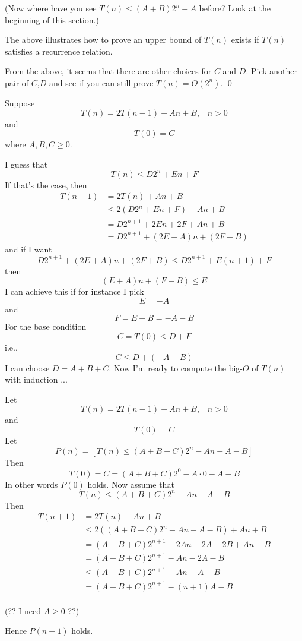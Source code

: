 (Now where have you see
$T(n) \leq (A+B)2^n - A$ before?
Look at the beginning of this section.)

The above illustrates how to prove an upper bound
of $T(n)$ exists 
if $T(n)$
satisfies a recurrence relation.

\begin{ex}
  From the above, it seems that there are other choices for $C$ and $D$.
  Pick another pair of $C$,$D$ and see if you can still
  prove $T(n) = O(2^n)$.
  \qed
\end{ex}


\newpage
Suppose
\[
T(n) = 2T(n - 1) + An + B, \,\,\,\,\, n > 0
\]
and
\[
T(0) = C
\]
where $A, B, C \geq 0$.

I guess that 
\[
T(n) \leq D2^n + En + F
\]
If that's the case, then
\begin{align*}
T(n+1)
&= 2T(n) + An + B \\
&\leq 2(D2^n + En + F) + An + B \\
&= D2^{n+1} + 2En + 2F + An + B \\
&= D2^{n+1} + (2E + A) n + (2F + B) 
\end{align*}
and if I want
\[
D2^{n+1} + (2E + A) n + (2F + B) \leq D2^{n+1} + E(n+1) + F
\]
then
\[
(E + A) n + (F + B) \leq E 
\]
I can achieve this if for instance I pick
\[
E = -A
\]
and
\[
F = E - B = -A - B
\]
For the base condition
\[
C = T(0) \leq D + F
\]
i.e.,
\[
C \leq D + (-A-B)
\]
I can choose $D = A+B+C$.
Now I'm ready to compute the big-$O$ of $T(n)$ with induction ...

Let
\[
T(n) = 2T(n - 1) + An + B, \,\,\,\,\, n > 0
\]
and
\[
T(0) = C
\]
Let
\[
P(n) = [T(n)\leq (A+B+C)2^n - An - A - B]
\]
Then
\[
T(0) = C = (A + B + C)2^0 - A\cdot 0 - A - B
\]
In other words $P(0)$ holds.
Now assume that
\[
T(n) \leq (A+B+C)2^n - An - A - B
\]
Then
\begin{align*}
  T(n+1)
  &= 2T(n) + An + B \\
  &\leq 2 ((A+B+C)2^n - An - A - B) + An + B \\
  &= (A+B+C)2^{n+1} - 2An - 2A - 2B + An + B \\
  &= (A+B+C)2^{n+1} - An - 2A - B \\
  &\leq (A+B+C)2^{n+1} - An - A - B \\
  &= (A+B+C)2^{n+1} - (n + 1)A - B \\
\end{align*}

(?? I need $A \geq 0$ ??)

Hence $P(n+1)$ holds.

\newpage

